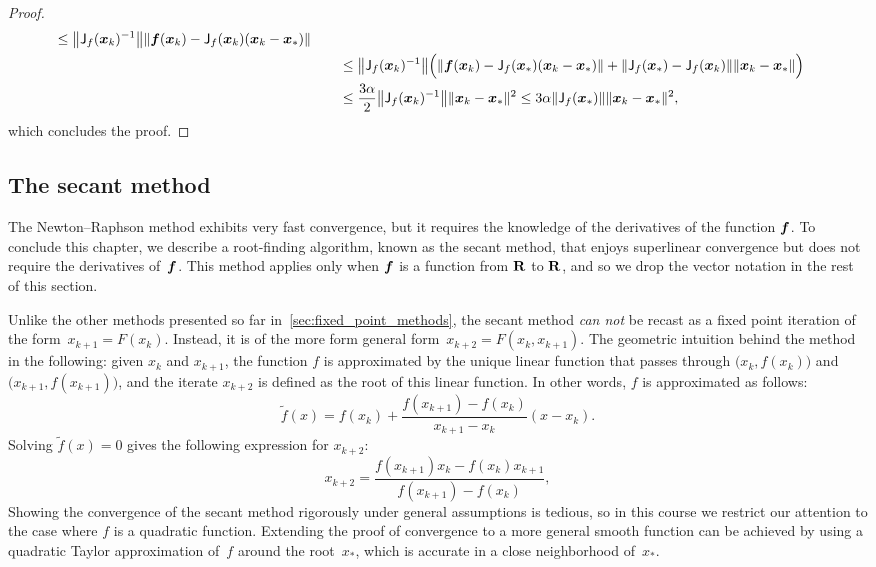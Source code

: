 \begin{proof}
\begin{align*}
         \leq \norm*{\mat J_f(\vect x_k)^{-1}} \norm*{\vect f(\vect x_k) - \mat J_f(\vect x_k) (\vect x_k - \vect x_*) } \\
        &\qquad \leq \norm*{\mat J_f(\vect x_k)^{-1}} \Bigl( \norm{\vect f(\vect x_k) - \mat J_f(\vect x_*) (\vect x_k - \vect x_*) } + \norm{\mat J_f(\vect x_*) - \mat J_f(\vect x_k)} \norm{\vect x_k - \vect x_*} \Bigr) \\
        &\qquad \leq \frac{3 \alpha}{2}\norm*{\mat J_f(\vect x_k)^{-1}} \norm{\vect x_k - \vect x_*}^2 \leq 3 \alpha \norm{\mat J_f(\vect x_*)} \norm{\vect x_k - \vect x_*}^2,
    \end{align*}
    which concludes the proof.
\end{proof}

\subsection{The secant method~\moreinfo}
The Newton--Raphson method exhibits very fast convergence,
but it requires the knowledge of the derivatives of the function $\mathbf{\boldsymbol{f}}$.
To conclude this chapter,
we describe a root-finding algorithm,
known as the secant method,
that enjoys superlinear convergence but does not require the derivatives of~$\mathbf{\boldsymbol{f}}$.
This method applies only when $\mathbf{\boldsymbol{f}}$ is a function from $\mathbf R$ to $\mathbf R$,
and so we drop the vector notation in the rest of this section.

Unlike the other methods presented so far in~\cref{sec:fixed_point_methods},
the secant method \emph{can not} be recast as a fixed point iteration of the form~$x_{k+1} = F(x_{k})$.
Instead, it is of the more form general form~$x_{k+2} = F(x_k, x_{k+1})$.
The geometric intuition behind the method in the following: given $x_k$ and $x_{k+1}$,
the function $f$ is approximated by the unique linear function that passes through $\bigl(x_k, f(x_k)\bigr)$ and
$\bigl(x_{k+1}, f(x_{k+1})\bigr)$,
and the iterate $x_{k+2}$ is defined as the root of this linear function.
In other words, $f$ is approximated as follows:
\[
    \widetilde f(x) = f(x_k) + \frac{f(x_{k+1}) - f(x_k)}{x_{k+1} - x_k} (x - x_k).
\]
Solving $\widetilde f(x) = 0$ gives the following expression for $x_{k+2}$:
\begin{equation}
    \label{eq:secant_method}
    x_{k+2} = \frac{f(x_{k+1}) x_k - f(x_k) x_{k+1}}{f(x_{k+1}) - f(x_k)},
\end{equation}
Showing the convergence of the secant method rigorously under general assumptions is tedious,
so in this course we restrict our attention to the case where $f$ is a quadratic function.
Extending the proof of convergence to a more general smooth function can be achieved
by using a quadratic Taylor approximation of~$f$ around the root~$x_*$,
which is accurate in a close neighborhood of~$x_*$.

